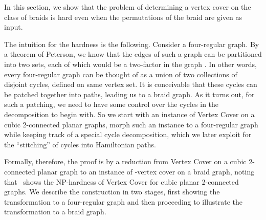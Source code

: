 \documentclass[svgnames]{llncs}
\newcommand{\braid}{braid}
\begin{document}
In this section, we show that the problem of determining a vertex cover on the class of \braid{}s is hard even when the permutations of the \braid{} are given as input. 

The intuition for the hardness is the following. Consider a four-regular graph. By a theorem of Peterson, we know that the edges of such a graph can be partitioned into two sets, each of which would
be a two-factor in the graph . In other words, every four-regular graph can be thought of as a union of two collections of disjoint cycles, defined on same vertex set. It is conceivable
that these cycles can be patched together into paths, leading us to a braid graph. As it turns out, for such a patching, we need to have some control over the cycles in the decomposition to begin with. 
So we start with an instance of Vertex Cover on a cubic 2-connected planar graphs, morph such an instance to a four-regular graph while keeping track of a special cycle decomposition, which 
we later exploit for the ``stitching'' of cycles into Hamiltonian paths. 

Formally, therefore, the proof is by a reduction from Vertex Cover on a cubic 2-connected planar graph to an instance of -vertex cover on a \braid{} graph, noting that~\cite{Mohar2001102} shows the NP-hardness of 
Vertex Cover for cubic planar 2-connected graphs. We describe the construction in two stages, first showing the transformation to a four-regular graph and then proceeding to illustrate the transformation to a braid graph. 
\end{document}
